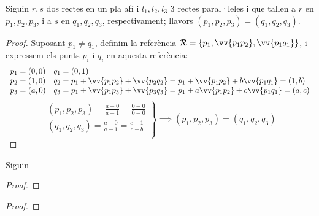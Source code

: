 \begin{thm}[de Tales]
	Siguin $r,s$ dos rectes en un pla afí i $l_1,l_2,l_3$ 3 rectes paral·leles i que tallen a $r$ en $p_1,p_2,p_3$, i a $s$ en $q_1,q_2,q_3$, respectivament; llavors $(p_1,p_2,p_3)=(q_1,q_2,q_3)$.
\end{thm}
\begin{proof}
	Suposant $p_1\neq q_1$, definim la referència $\mathcal{R}=\{p_1,\vv{p_1p_2},\vv{p_1q_1}\}$, i expressem els punts $p_i$ i $q_i$ en aquesta referència: \\
	\[\begin{array}{ll}
		p_1=(0,0) & q_1=(0,1)\\
		p_2=(1,0) & q_2=p_1+\vv{p_1p_2}+\vv{p_2q_2}=p_1+\vv{p_1p_2}+b\vv{p_1q_1}=(1,b) \\
		p_3=(a,0) & q_3=p_1+\vv{p_1p_3}+\vv{p_3q_3}=p_1+a\vv{p_1p_2}+c\vv{p_1q_1}=(a,c)\\
	\end{array}\]
	\[\left.\begin{array}{l}
		(p_1,p_2,p_3)=\frac{a-0}{a-1}=\frac{0-0}{0-0} \\
		(q_1,q_2,q_3)=\frac{a-0}{a-1}=\frac{c-1}{c-b} \\
	\end{array}\right\}\implies (p_1,p_2,p_3)=(q_1,q_2,q_3)\]
\end{proof}

\begin{thm}[de Menelao]
	Siguin 
\end{thm}
\begin{proof}
	
\end{proof}

\begin{thm}[]
	
\end{thm}
\begin{proof}
	
\end{proof}
